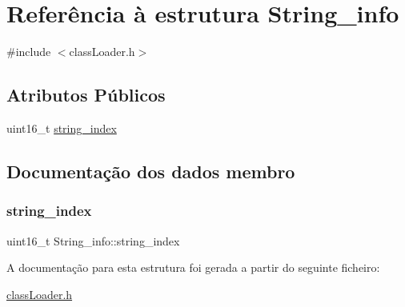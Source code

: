 \hypertarget{struct_string__info}{}\section{Referência à estrutura String\+\_\+info}
\label{struct_string__info}


{\ttfamily \#include $<$class\+Loader.\+h$>$}

\subsection*{Atributos Públicos}
\begin{DoxyCompactItemize}
\item 
uint16\+\_\+t \hyperlink{struct_string__info_aaac61da311e666fab8df42640547b2ce}{string\+\_\+index}
\end{DoxyCompactItemize}


\subsection{Documentação dos dados membro}
\hypertarget{struct_string__info_aaac61da311e666fab8df42640547b2ce}{}\label{struct_string__info_aaac61da311e666fab8df42640547b2ce} 
\subsubsection{\texorpdfstring{string\+\_\+index}{string\_index}}
{\footnotesize\ttfamily uint16\+\_\+t String\+\_\+info\+::string\+\_\+index}



A documentação para esta estrutura foi gerada a partir do seguinte ficheiro\+:\begin{DoxyCompactItemize}
\item 
\hyperlink{class_loader_8h}{class\+Loader.\+h}\end{DoxyCompactItemize}
